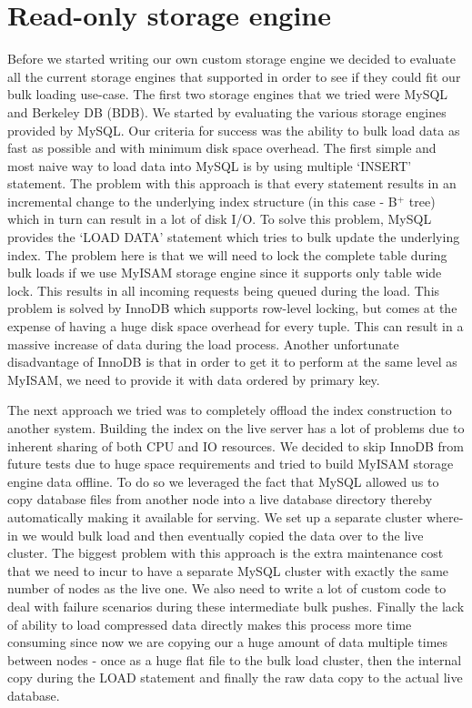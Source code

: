 \documentclass[10pt,twocolumn,preprint,natbib,authoryear]{sigplanconf}
\begin{document}

\section{Read-only storage engine}
\label{sec:read_only}

Before we started writing our own custom storage engine we decided to evaluate all the current storage engines that \projectname{} supported in order to see if they could fit our bulk loading use-case. The first two storage engines that we tried were MySQL and Berkeley DB (BDB). We started by evaluating the various storage engines provided by MySQL. Our criteria for success was the ability to bulk load data as fast as possible and with minimum disk space overhead. The first simple and most naive way to load data into MySQL is by using multiple `INSERT' statement. The problem with this approach is that every statement results in an incremental change to the underlying index structure (in this case - B$^{+}$ tree) which in turn can result in a lot of disk I/O. To solve this problem, MySQL provides the `LOAD DATA' statement which tries to bulk update the underlying index. The problem here is that we will need to lock the complete table during bulk loads if we use MyISAM storage engine since it supports only table wide lock. This results in all incoming requests being queued during the load. This problem is solved by InnoDB which supports row-level locking, but comes at the expense of having a huge disk space overhead for every tuple. This can result in a massive increase of data during the load process. Another unfortunate disadvantage of InnoDB is that in order to get it to perform at the same level as MyISAM, we need to provide it with data ordered by primary key. 

The next approach we tried was to completely offload the index construction to another system. Building the index on the live server has a lot of problems due to inherent sharing of both CPU and IO resources. We decided to skip InnoDB from future tests due to huge space requirements and tried to build MyISAM storage engine data offline. To do so we leveraged the fact that MySQL allowed us to copy database files from another node into a live database directory thereby automatically making it available for serving. We set up a separate cluster where-in we would bulk load and then eventually copied the data over to the live cluster. The biggest problem with this approach is the extra maintenance cost that we need to incur to have a separate MySQL cluster with exactly the same number of nodes as the live one. We also need to write a lot of custom code to deal with failure scenarios during these intermediate bulk pushes. Finally the lack of ability to load compressed data directly makes this process more time consuming since now we are copying our a huge amount of data multiple times between nodes - once as a huge flat file to the bulk load cluster, then the internal copy during the LOAD statement and finally the raw data copy to the actual live database. 
\end{document}
